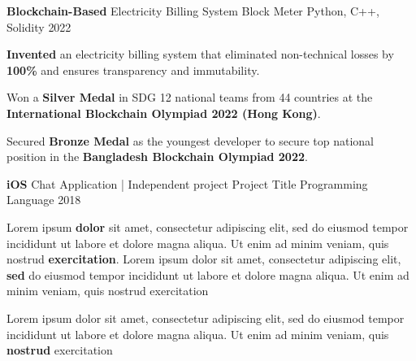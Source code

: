 

\begin{cventries}

  \cventry
    {\textbf{Blockchain-Based} Electricity Billing System } %
    {Block Meter} %
    {Python, C++, Solidity} %
    {2022} %
    {
      \begin{cvitems} %
        \item {\textbf{Invented} an electricity billing system that eliminated non-technical losses by \textbf{100\%} and ensures transparency and immutability.}
        \item {Won a \textbf{Silver Medal} in SDG 12 national teams from 44 countries at the \textbf{International Blockchain Olympiad 2022 (Hong Kong)}.}
        \item {Secured \textbf{Bronze Medal} as the youngest developer to secure top national position in the \textbf{Bangladesh Blockchain Olympiad 2022}.}
      \end{cvitems}
    }

  \cventry
    {\textbf{iOS} Chat Application   |   Independent project} %
    {Project Title} %
    {Programming Language} %
    {2018} %
    {
      \begin{cvitems} %
        \item {Lorem ipsum \textbf{dolor} sit amet, consectetur adipiscing elit, sed do eiusmod tempor incididunt ut labore et dolore magna aliqua. Ut enim ad minim veniam, quis nostrud \textbf{exercitation}. Lorem ipsum dolor sit amet, consectetur adipiscing elit, \textbf{sed} do eiusmod tempor incididunt ut labore et dolore magna aliqua. Ut enim ad minim veniam, quis nostrud exercitation}
        \item {Lorem ipsum dolor sit amet, consectetur adipiscing elit, sed do eiusmod tempor incididunt ut labore et dolore magna aliqua. Ut enim ad minim veniam, quis \textbf{nostrud} exercitation}
      \end{cvitems}
    }


\end{cventries}
